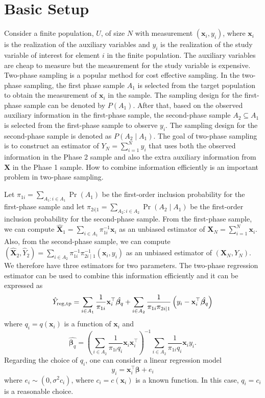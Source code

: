 \documentclass[12pt]{article}
\newcommand{\bx}{\mathbf{x}}
\renewcommand{\bf}[1]{\mathbf{#1}}
\begin{document}
\newpage 

\section{Basic Setup}

Consider a finite population, $U$, of size $N$ 
with measurement  $(\bx_i, y_i)$, where $\bx_i$ is the realization of the
auxiliary variables and $y_i$ is the realization of the study variable of
interest for element  $i$ in the finite population. The auxiliary variables are
cheap to measure but the measurement for the study variable is expensive.
Two-phase sampling is a popular method for cost effective sampling.
In the two-phase sampling, the first phase sample $A_1$  is selected from the
target population to obtain the measurement of $\bx_i$ in the sample. The
sampling design for the first-phase sample can be denoted by $P(A_1)$. After
that, based on the observed auxiliary information in the first-phase  sample,
the second-phase sample $A_2 \subseteq A_1$ is selected from the first-phase
sample to observe $y_i$. The sampling design for the second-phase sample is
denoted as $P( A_2 \mid A_1)$.  
The
goal of two-phase sampling is to construct an estimator of $Y_N =  \sum_{i=1}^N y_i$ 
that uses both the observed information in the Phase 2 sample and also the extra
auxiliary information from $\bf X$ in the Phase 1 sample. How to combine
information efficiently is an important problem in two-phase sampling. 

Let $\pi_{1i} = \sum_{A_1: i \in A_1} \Pr(A_1)$ be the first-order inclusion
probability for the first-phase sample and let $\pi_{2i | 1} = \sum_{A_2: i \in
A_2} \Pr(A_2 \mid A_1)$ be the first-order inclusion probability for the
second-phase sample. From the first-phase sample, we can compute
$\widehat{\mathbf{X}}_1 = \sum_{i \in A_1} \pi_{1i}^{-1} \bx_i$ as an unbiased
estimator of $\mathbf{X}_N = \sum_{i=1}^N  \bx_i$. Also, from the second-phase
sample, we can compute $\left( \widehat{\mathbf{X}}_2 , \hat{Y}_2 \right) =
\sum_{i \in A_2} \pi_{1i}^{-1} \pi_{2i \mid 1}^{-1} \left( \bx_i, y_i\right)$ as
an unbiased estimator of $(\mathbf{X}_N, Y_N)$.
We therefore have three estimators for
two parameters. The two-phase regression estimator can be  used to combine this
information efficiently and it can be expressed as  
\begin{equation} \label{eq:1}
\hat Y_{\rm reg, tp} 
= \sum_{i \in A_1} \frac{1}{\pi_{1i}} \bf x_i^\top  \hat{\bm \beta_q} + 
\sum_{i \in A_2} \frac{1}{\pi_{1i}\pi_{2i|1}} \left(y_i - \bf x_i^\top  \hat{\bm \beta_q}\right)
\end{equation} 
where $q_i = q(\bf x_i)$  is a function of $\bf x_i$ and  
$$
\hat{\bm \beta_q} = \left(\sum_{i \in A_2} 
 \frac{1}{\pi_{1i} q_i } \bf x_i \bf x_i^\top \right)^{-1} 
\sum_{i \in A_2} \frac{1}{\pi_{1i} q_i} \bf x_i y_i .
$$ 
Regarding the choice of $q_i$, one can consider a linear regression model 
\begin{equation}
y_i = \bx_i^\top \bm \beta + e_i 
\end{equation}
where $e_i \sim \left(0, \sigma^2 c_i \right)$, where $c_i=c( \bx_i)$ is a known
function. In this case,   $q_i=c_i$ is a reasonable choice. 
\end{document}
